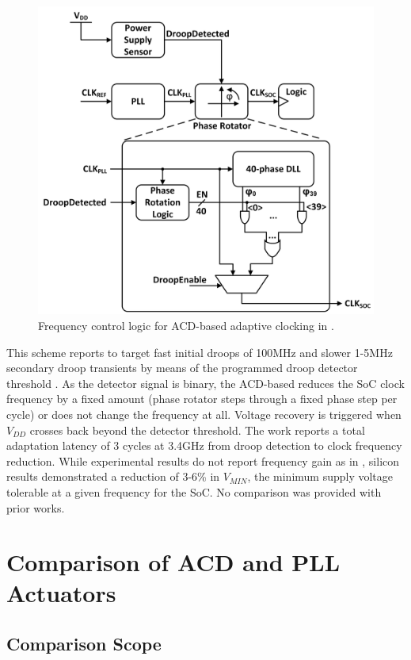 \documentclass[twoside,9pt,journal,letterpage]{IEEEtran}
\begin{document}
\begin{figure}[h]
	\centering
	\includegraphics[width=0.7\columnwidth]{fig_detail_acd}
	\caption{Frequency control logic for ACD-based adaptive clocking in \cite{wilcox2015}.}
	\label{fig:detail_acd}
\end{figure}

This scheme reports to target fast initial droops of 100MHz and slower 1-5MHz secondary droop transients by means of the programmed droop detector threshold \cite{wilcox2015}. As the detector signal is binary, the ACD-based reduces the SoC clock frequency by a fixed amount (phase rotator steps through a fixed phase step per cycle) or does not change the frequency at all. Voltage recovery is triggered when $V_{DD}$ crosses back beyond the detector threshold. The work reports a total adaptation latency of 3 cycles at 3.4GHz from droop detection to clock frequency reduction. While experimental results do not report frequency gain as in \cite{hashimoto2018}, silicon results demonstrated a reduction of 3-6\% in $V_{MIN}$, the minimum supply voltage tolerable at a given frequency for the SoC. No comparison was provided with prior works.

\section{Comparison of ACD and PLL Actuators}
\label{sec:comparison}

\subsection{Comparison Scope}
\label{sec:Scope of comparison}
\end{document}
